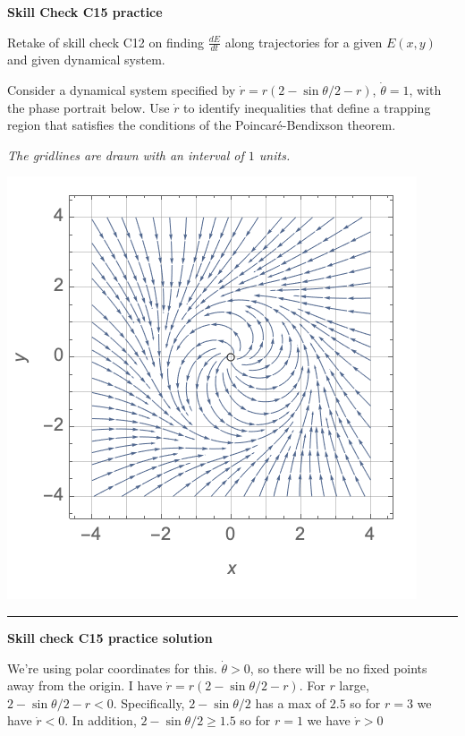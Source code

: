 \documentclass[12pt,letterpaper,noanswers]{exam}
\begin{document}
\noindent\textbf{Skill Check C15 practice}
\begin{questions}
\item Retake of skill check C12 on finding $\frac{dE}{dt}$ along trajectories for a given $E(x,y)$ and given dynamical system.

\item Consider a dynamical system specified by $\dot r = r(2-\sin\theta/2 -r)$, $\dot\theta = 1$, with the phase portrait below.  Use $\dot r$ to identify inequalities that define a trapping region that satisfies the conditions of the Poincar\'e-Bendixson theorem.


\emph{The gridlines are drawn with an interval of $1$ units.}


\includegraphics[]{img/C14-C15trapping.png}

\vspace{0.2cm}

\hrule
\vspace{0.2cm}
\end{questions}



\noindent\textbf{Skill check C15 practice solution}

We're using polar coordinates for this. $\dot\theta >0$, so there will be no fixed points away from the origin.  I have $\dot r = r(2-\sin\theta/2-r)$.  For $r$ large, $2-\sin\theta/2 -r < 0$.  Specifically, $2-\sin\theta/2$ has a max of $2.5$ so for $r = 3$ we have $\dot r < 0$.  In addition, $2-\sin\theta/2\geq 1.5$ so for $r = 1$ we have $\dot r > 0$
\end{document}
